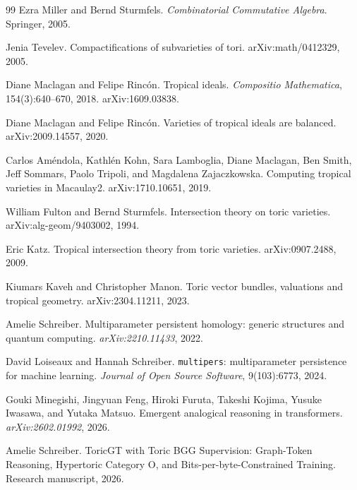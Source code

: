 \documentclass[11pt]{article}
\begin{document}
\begin{thebibliography}{99}
Ezra Miller and Bernd Sturmfels.
\newblock \emph{Combinatorial Commutative Algebra}.
\newblock Springer, 2005.

Jenia Tevelev.
\newblock Compactifications of subvarieties of tori.
\newblock arXiv:math/0412329, 2005.

Diane Maclagan and Felipe Rinc\'on.
\newblock Tropical ideals.
\newblock \emph{Compositio Mathematica}, 154(3):640--670, 2018. arXiv:1609.03838.

Diane Maclagan and Felipe Rinc\'on.
\newblock Varieties of tropical ideals are balanced.
\newblock arXiv:2009.14557, 2020.

Carlos Am\'endola, Kathl\'en Kohn, Sara Lamboglia, Diane Maclagan, Ben Smith, Jeff Sommars, Paolo Tripoli, and Magdalena Zajaczkowska.
\newblock Computing tropical varieties in Macaulay2.
\newblock arXiv:1710.10651, 2019.

William Fulton and Bernd Sturmfels.
\newblock Intersection theory on toric varieties.
\newblock arXiv:alg-geom/9403002, 1994.

Eric Katz.
\newblock Tropical intersection theory from toric varieties.
\newblock arXiv:0907.2488, 2009.

Kiumars Kaveh and Christopher Manon.
\newblock Toric vector bundles, valuations and tropical geometry.
\newblock arXiv:2304.11211, 2023.

Amelie Schreiber.
\newblock Multiparameter persistent homology: generic structures and quantum computing.
\newblock \emph{arXiv:2210.11433}, 2022.

David Loiseaux and Hannah Schreiber.
\newblock \texttt{multipers}: multiparameter persistence for machine learning.
\newblock \emph{Journal of Open Source Software}, 9(103):6773, 2024.

Gouki Minegishi, Jingyuan Feng, Hiroki Furuta, Takeshi Kojima, Yusuke Iwasawa, and Yutaka Matsuo.
\newblock Emergent analogical reasoning in transformers.
\newblock \emph{arXiv:2602.01992}, 2026.

Amelie Schreiber.
\newblock ToricGT with Toric BGG Supervision: Graph-Token Reasoning, Hypertoric Category O, and Bits-per-byte-Constrained Training.
\newblock Research manuscript, 2026.


\end{thebibliography}
\end{document}
